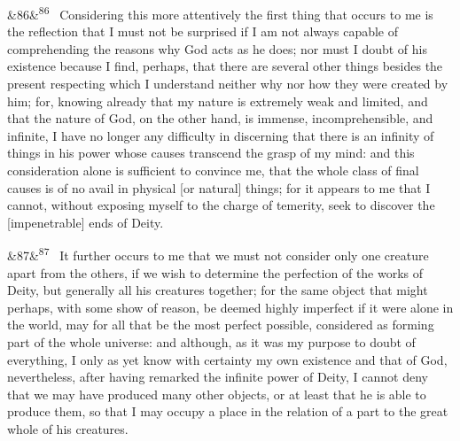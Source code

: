 \documentclass[12pt]{article}
\newcommand{\para}[1][]{\par\noindent\ifx&#1&\else\textsuperscript{\footnotesize #1}~\fi}
\begin{document}
\para[86] Considering this more attentively the first thing that occurs to me is the reflection that I must not be surprised if I am not always capable of comprehending the reasons why God acts as he does; nor must I doubt of his existence because I find, perhaps, that there are several other things besides the present respecting which I understand neither why nor how they were created by him; for, knowing already that my nature is extremely weak and limited, and that the nature of God, on the other hand, is immense, incomprehensible, and infinite, I have no longer any difficulty in discerning that there is an infinity of things in his power whose causes transcend the grasp of my mind: and this consideration alone is sufficient to convince me, that the whole class of final causes is of no avail in physical [or natural] things; for it appears to me that I cannot, without exposing myself to the charge of temerity, seek to discover the [impenetrable] ends of Deity.

\para[87] It further occurs to me that we must not consider only one creature apart from the others, if we wish to determine the perfection of the works of Deity, but generally all his creatures together; for the same object that might perhaps, with some show of reason, be deemed highly imperfect if it were alone in the world, may for all that be the most perfect possible, considered as forming part of the whole universe: and although, as it was my purpose to doubt of everything, I only as yet know with certainty my own existence and that of God, nevertheless, after having remarked the infinite power of Deity, I cannot deny that we may have produced many other objects, or at least that he is able to produce them, so that I may occupy a place in the relation of a part to the great whole of his creatures.
\end{document}
